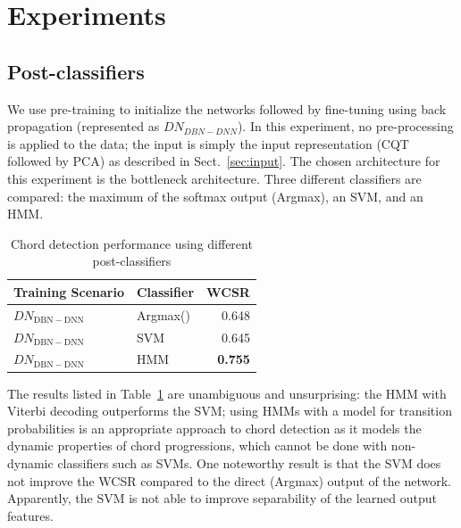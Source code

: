 \documentclass{article}
\begin{document}
\section{Experiments}

\subsection{Post-classifiers}
We use pre-training to initialize the networks followed by fine-tuning using back propagation (represented as $DN_{DBN-DNN}$). 
In this experiment, no pre-processing is applied to the data; the input is simply the input representation (CQT followed by PCA) as described in Sect.~\ref{sec:input}. The chosen architecture for this experiment is the bottleneck architecture. 
Three different classifiers are compared: the maximum of the softmax output (Argmax), an SVM, and an HMM. 
\begin{table}
\centering
\begin{tabular*}{\columnwidth}{@{\extracolsep{\fill}}llr}
\toprule
\textbf{Training Scenario} & \textbf{Classifier} & \textbf{WCSR}  \\ \hline

$DN_\mathrm{DBN-DNN}$         & Argmax()            & 0.648 \\ 
$DN_\mathrm{DBN-DNN}$          & SVM            & 0.645 \\ 
$DN_\mathrm{DBN-DNN}$         &  HMM           & \textbf{0.755} \\ \bottomrule
\end{tabular*}
\caption{Chord detection performance using different post-classifiers}
\label{tab:dbn-dnn}
\end{table}

The results listed in Table~\ref{tab:dbn-dnn} are unambiguous and unsurprising: the HMM with Viterbi decoding outperforms the SVM; using HMMs with a model for transition probabilities is an appropriate approach to chord detection as it models the dynamic properties of chord progressions, which cannot be done with non-dynamic classifiers such as SVMs. One noteworthy result is that the SVM does not improve the WCSR compared to the direct (Argmax) output of the network. Apparently, the SVM is not able to improve separability of the learned output features.
\end{document}
